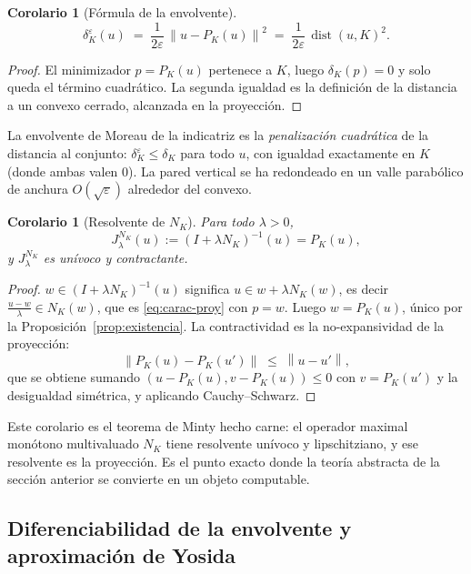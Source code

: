 \documentclass[11pt,a4paper]{article}
\newtheorem{corolario}[teorema]{Corolario}
\theoremstyle{definition}
\theoremstyle{remark}
\newcommand{\Norm}[1]{\left\lVert #1 \right\rVert}
\DeclareMathOperator{\dist}{dist}
\newcommand{\dk}{\delta_K}
\newcommand{\dke}{\delta_K^\varepsilon}
\newcommand{\pk}{P_K}
\begin{document}
\begin{corolario}[Fórmula de la envolvente]\label{cor:valor}
\[
\dke(u) \;=\; \frac{1}{2\varepsilon}\, \Norm{u - \pk(u)}^2
\;=\; \frac{1}{2\varepsilon}\, \dist(u, K)^2 .
\]
\end{corolario}

\begin{proof}
El minimizador $p = \pk(u)$ pertenece a $K$, luego $\dk(p) = 0$ y solo
queda el término cuadrático. La segunda igualdad es la definición de la
distancia a un convexo cerrado, alcanzada en la proyección.
\end{proof}

\begin{observación}
La envolvente de Moreau de la indicatriz es la \emph{penalización
cuadrática} de la distancia al conjunto: $\dke \le \dk$ para todo $u$,
con igualdad exactamente en $K$ (donde ambas valen $0$). La pared vertical
se ha redondeado en un valle parabólico de anchura $O(\sqrt{\varepsilon})$
alrededor del convexo.
\end{observación}

\begin{corolario}[Resolvente de $N_K$]\label{cor:resolvente}
Para todo $\lambda > 0$,
\[
J_\lambda^{N_K}(u) := (I + \lambda N_K)^{-1}(u) = \pk(u),
\]
y $J_\lambda^{N_K}$ es unívoco y contractante.
\end{corolario}

\begin{proof}
$w \in (I + \lambda N_K)^{-1}(u)$ significa $u \in w + \lambda N_K(w)$, es
decir $\frac{u - w}{\lambda} \in N_K(w)$, que es
\eqref{eq:carac-proy} con $p = w$. Luego $w = \pk(u)$, único por la
Proposición~\ref{prop:existencia}. La contractividad es la no-expansividad
de la proyección:
\[
\Norm{\pk(u) - \pk(u')} \;\le\; \Norm{u - u'} ,
\]
que se obtiene sumando $(u - \pk(u), v - \pk(u)) \le 0$ con
$v = \pk(u')$ y la desigualdad simétrica, y aplicando Cauchy--Schwarz.
\end{proof}

\begin{observación}
Este corolario es el teorema de Minty hecho carne: el operador maximal
monótono multivaluado $N_K$ tiene resolvente unívoco y lipschitziano, y ese
resolvente es la proyección. Es el punto exacto donde la teoría abstracta
de la sección anterior se convierte en un objeto computable.
\end{observación}

\subsection{Diferenciabilidad de la envolvente y aproximación de Yosida}
\end{document}

